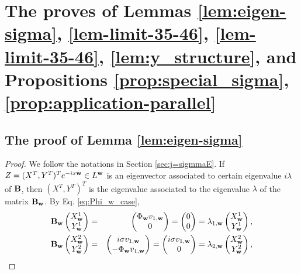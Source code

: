 \documentclass[10pt,reqno]{amsart}
\renewcommand{\(}{\left(}
\renewcommand{\)}{\right)}
\newcommand{\bw}{{\bf w}}
\newcommand{\BB}{{\bf B}}
\numberwithin{equation}{section}
\begin{document}
\appendix
\section{The proves of Lemmas \ref{lem:eigen-sigma}, \ref{lem-limit-35-46}, \ref{lem-limit-35-46}, \ref{lem:y_structure}, and Propositions \ref{prop:special_sigma}, \ref{prop:application-parallel}}
\subsection{The proof of Lemma \ref{lem:eigen-sigma}}\label{app-lem:eigen-sigma}
\begin{proof}
	We follow the notations in Section \ref{sec:j=sigmmaE}. If $Z=(X^T,Y^T)^T e^{-ix\bw} \in L^{\bw}$ is an eigenvector associated to certain eigenvalue $i\lambda$ of $\BB$, then $(X^T,Y^T)^T$ is the eigenvalue associated to the eigenvalue $\lambda$ of the matrix $\BB_{\bw}$. 
 By Eq. \ref{eq:Phi_w_case}, 
	\begin{eqnarray*}
		\BB_{\bw} \begin{pmatrix}
			X^1_{\bw}  \\
			Y^1_{\bw}
		\end{pmatrix} &=&  \begin{pmatrix}
			\Phi_{\bw}  v_{1,\bw}\\
			0
		\end{pmatrix} = \begin{pmatrix}
			0  \\
			0
		\end{pmatrix} =  \lambda_{1,\bw}\begin{pmatrix}
			X^1_{\bw}  \\
			Y^1_{\bw}
		\end{pmatrix}, \\
		\BB_{\bw} \begin{pmatrix}
			X^2_{\bw}  \\
			Y^2_{\bw}
		\end{pmatrix} &=&  \begin{pmatrix}
			i\sigma   v_{1,\bw}\\
			-\Phi_{\bw}  v_{1,\bw}
		\end{pmatrix} = \begin{pmatrix}
			i\sigma   v_{1,\bw}  \\
			0
		\end{pmatrix} =  \lambda_{2,\bw}\begin{pmatrix}
			X^2_{\bw}  \\
			Y^2_{\bw}
		\end{pmatrix}, \\

\end{eqnarray*}
\end{proof}
\end{document}
